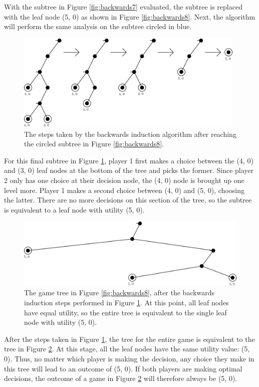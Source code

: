 With the subtree in Figure \ref{fig:backwards7} evaluated, the subtree is replaced with the leaf node (5, 0) as shown in Figure \ref{fig:backwards8}. Next, the algorithm will perform the same analysis on the subtree circled in blue.

\begin{figure}[H]
  \centering
  \includegraphics[width=11cm]{figures/Backwards9.png}
  \caption{The steps taken by the backwards induction algorithm after reaching the circled subtree in Figure \ref{fig:backwards8}.}
  \label{fig:backwards9}
\end{figure}

For this final subtree in Figure \ref{fig:backwards9}, player 1 first makes a choice between the (4, 0) and (3, 0) leaf nodes at the bottom of the tree and picks the former. Since player 2 only has one choice at their decision node, the (4, 0) node is brought up one level more. Player 1 makes a second choice between (4, 0) and (5, 0), choosing the latter. There are no more decisions on this section of the tree, so the subtree is equivalent to a leaf node with utility (5, 0).

\begin{figure}[H]
  \centering
  \includegraphics[width=12cm]{figures/Backwards10.png}
  \caption{The game tree in Figure \ref{fig:backwards8}, after the backwards induction steps performed in Figure \ref{fig:backwards9}. At this point, all leaf nodes have equal utility, so the entire tree is equivalent to the single leaf node with utility (5, 0).}
  \label{fig:backwards10}
\end{figure}

After the steps taken in Figure \ref{fig:backwards9}, the tree for the entire game is equivalent to the tree in Figure \ref{fig:backwards10}. At this stage, all the leaf nodes have the same utility value: (5, 0). Thus, no matter which player is making the decision, any choice they make in this tree will lead to an outcome of (5, 0). If both players are making optimal decisions, the outcome of a game in Figure \ref{fig:backwards10} will therefore always be (5, 0).

